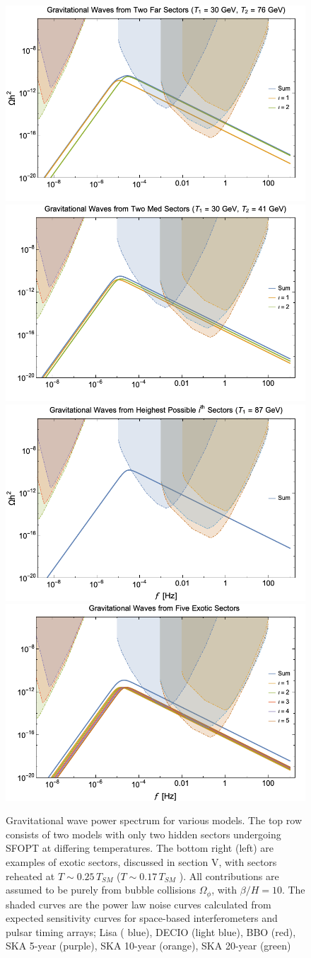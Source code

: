 \documentclass[nofootinbib,twocolumn,preprintnumbers]{revtex4-1}
\begin{document}
\begin{figure}[tb]
\centering
\begin{minipage}[c]{\textwidth}
\includegraphics[width=.45\textwidth]{TwoFar.png} 
\hfill
\includegraphics[width=.45\textwidth]{TwoMed.png} 
\hfill
\includegraphics[width=.45\textwidth ]{highest.png}
\hfill
\includegraphics[width=.45\textwidth]{energydensity.png} 
\end{minipage}
\hfill
\caption{ Gravitational wave power spectrum for various models. The top row consists of two models with only two hidden sectors undergoing SFOPT at differing temperatures. The bottom right (left) are examples of exotic sectors, discussed in section V, with sectors reheated at $T \sim 0.25\,T_{SM}$ ($T \sim 0.17\,T_{SM}$ ). All contributions are assumed to be purely from bubble collisions $\Omega_{\phi}$, with $\beta/H  = 10$.  The shaded curves are the power law noise curves calculated from expected sensitivity curves for space-based interferometers and pulsar timing arrays; Lisa ( blue), DECIO (light blue), BBO (red), SKA 5-year (purple), SKA 10-year (orange), SKA 20-year (green)   }
\label{fig:Haa}
\end{figure}
\end{document}
